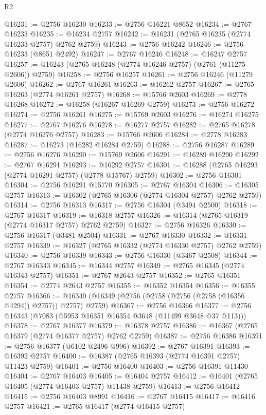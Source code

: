 \begin{lexlean}{R2}
\begin{coremodule}
@16231 := @2756 @16230
@16233 := @2756 @16221 @8652
@16234 := @2767 @16233
@16235 := @16234 @2757
@16242 := @16231 (@2765 @16235 (@2774 @16233 @2757) @2762 @2759)
@16243 := @2756 @16242
@16246 := @2756 @16233 (@8651 @2492)
@16247 := @2767 @16246
@16248 := @16247 @2757
@16257 := @16243 (@2765 @16248 (@2774 @16246 @2757) (@2761 (@11275 @2606)) @2759)
@16258 := @2756 @16257
@16261 := @2756 @16246 (@11279 @2606)
@16262 := @2767 @16261
@16263 := @16262 @2757
@16267 := @2765 @16263 (@2774 @16261 @2757)
@16268 := @15766 @2603
@16269 := @2778 @16268
@16272 := @16258 (@16267 @16269 @2759)
@16273 := @2756 @16272
@16274 := @2756 @16261
@16275 := @15769 @2603
@16276 := @16274 @16275
@16277 := @2767 @16276
@16278 := @16277 @2757
@16282 := @2765 @16278 (@2774 @16276 @2757)
@16283 := @15766 @2606
@16284 := @2778 @16283
@16287 := @16273 (@16282 @16284 @2759)
@16288 := @2756 @16287
@16289 := @2756 @16276
@16290 := @15769 @2606
@16291 := @16289 @16290
@16292 := @2767 @16291
@16293 := @16292 @2757
@16301 := @16288 (@2765 @16293 (@2774 @16291 @2757) (@2778 @15767) @2759)
@16302 := @2756 @16301
@16304 := @2756 @16291 @15770
@16305 := @2767 @16304
@16306 := @16305 @2757
@16313 := @16302 (@2765 @16306 (@2774 @16304 @2757) @2762 @2759)
@16314 := @2756 @16313
@16317 := @2756 @16304 (@3494 @2500)
@16318 := @2767 @16317
@16319 := @16318 @2757
@16326 := @16314 (@2765 @16319 (@2774 @16317 @2757) @2762 @2759)
@16327 := @2756 @16326
@16330 := @2756 @16317 (@3481 @2504)
@16331 := @2767 @16330
@16332 := @16331 @2757
@16339 := @16327 (@2765 @16332 (@2774 @16330 @2757) @2762 @2759)
@16340 := @2756 @16339
@16343 := @2756 @16330 (@3467 @2508)
@16344 := @2767 @16343
@16345 := @16344 @2757
@16349 := @2765 @16345 (@2774 @16343 @2757)
@16351 := @2767 @2643 @2757
@16352 := @2765 @16351
@16354 := @2774 @2643 @2757
@16355 := @16352 @16354
@16356 := @16355 @2757
@16366 := @16340 (@16349 (@2756 (@2758 (@2756 (@2758 (@16356 @4294)) @2757)) @2757) @2759)
@16367 := @2756 @16366
@16377 := @2756 @16343 (@7083 (@5953 @16351 @16354 @3648 (@11499 @3648 @37 @113)))
@16378 := @2767 @16377
@16379 := @16378 @2757
@16386 := @16367 (@2765 @16379 (@2774 @16377 @2757) @2762 @2759)
@16387 := @2756 @16386
@16391 := @2756 @16377 (@6102 @2496 @996)
@16392 := @2767 @16391
@16393 := @16392 @2757
@16400 := @16387 (@2765 @16393 (@2774 @16391 @2757) @11423 @2759)
@16401 := @2756 @16400
@16403 := @2756 @16391 @11430
@16404 := @2767 @16403
@16405 := @16404 @2757
@16412 := @16401 (@2765 @16405 (@2774 @16403 @2757) @11438 @2759)
@16413 := @2756 @16412
@16415 := @2756 @16403 @8991
@16416 := @2767 @16415
@16417 := @16416 @2757
@16421 := @2765 @16417 (@2774 @16415 @2757)

\end{coremodule}
\end{lexlean}
